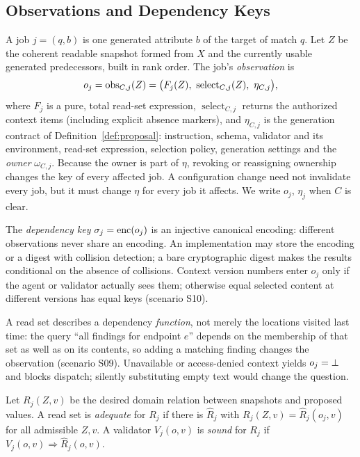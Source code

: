 \subsection{Observations and Dependency Keys}
A job $j=(q,b)$ is one generated attribute $b$ of the target of match $q$. Let $Z$ be the coherent readable snapshot formed from $X$ and the currently usable generated predecessors, built in rank order. The job's \emph{observation} is
\begin{equation}\label{eq:obs}
o_j=\obs_{C,j}(Z)=\bigl(F_j(Z),\ \operatorname{select}_{C,j}(Z),\ \eta_{C,j}\bigr),
\end{equation}
where $F_j$ is a pure, total read-set expression, $\operatorname{select}_{C,j}$ returns the authorized context items (including explicit absence markers), and $\eta_{C,j}$ is the generation contract of Definition~\ref{def:proposal}: instruction, schema, validator and its environment, read-set expression, selection policy, generation settings and the \emph{owner} $\omega_{C,j}$. Because the owner is part of $\eta$, revoking or reassigning ownership changes the key of every affected job. A configuration change need not invalidate every job, but it must change $\eta$ for every job it affects. We write $o_j$, $\eta_j$ when $C$ is clear.

The \emph{dependency key} $\sigma_j=\operatorname{enc}(o_j)$ is an injective canonical encoding: different observations never share an encoding. An implementation may store the encoding or a digest with collision detection; a bare cryptographic digest makes the results conditional on the absence of collisions. Context version numbers enter $o_j$ only if the agent or validator actually sees them; otherwise equal selected content at different versions has equal keys (scenario S10).

A read set describes a dependency \emph{function}, not merely the locations visited last time: the query ``all findings for endpoint $e$'' depends on the membership of that set as well as on its contents, so adding a matching finding changes the observation (scenario S09). Unavailable or access-denied context yields $o_j=\bot$ and blocks dispatch; silently substituting empty text would change the question.

\begin{definition}\label{def:adequate}
Let $R_j(Z,v)$ be the desired domain relation between snapshots and proposed values. A read set is \emph{adequate} for $R_j$ if there is $\widehat R_j$ with $R_j(Z,v)=\widehat R_j(o_j,v)$ for all admissible $Z,v$. A validator $V_j(o,v)$ is \emph{sound} for $R_j$ if $V_j(o,v)\Rightarrow\widehat R_j(o,v)$.
\end{definition}

